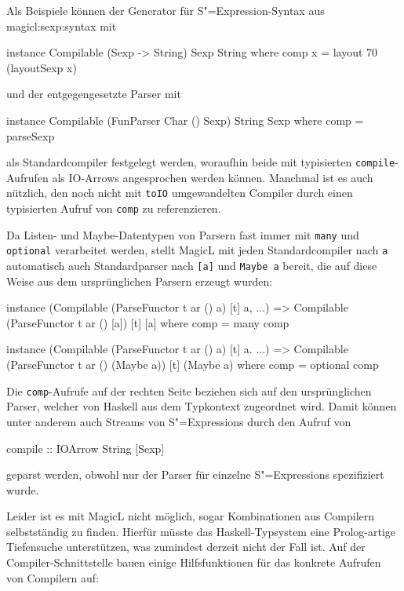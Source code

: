 \documentclass[12pt, a4paper, bibgerm]{scrbook}
\newenvironment{DIFnomarkup}{}{}
\newcommand\icode[1]{\lstinline?#1?}
\newcommand\sref{}
\newcommand{\sexp}{S"=Expression}
\newcommand{\sexps}{S"=Expressions}
\begin{document}
Als Beispiele können der Generator für \sexp{}-Syntax aus
\sref{magicl:sexp:syntax} mit
\begin{DIFnomarkup}\begin{code}
instance Compilable (Sexp -> String) Sexp String where
  comp x = layout 70 (layoutSexp x)
\end{code}\end{DIFnomarkup}
und der entgegengesetzte Parser mit
\begin{DIFnomarkup}\begin{code}
instance Compilable (FunParser Char () Sexp) String Sexp where
  comp = parseSexp
\end{code}\end{DIFnomarkup}
als Standardcompiler festgelegt werden, woraufhin beide mit typisierten
\icode{compile}-Aufrufen als IO-Arrows angesprochen werden
können. Manchmal ist es auch nützlich, den noch nicht mit \icode{toIO}
umgewandelten Compiler durch einen typisierten Aufruf von \icode{comp}
zu referenzieren.

Da Listen- und Maybe-Datentypen von Parsern fast immer mit \icode{many}
und \icode{optional} verarbeitet werden, stellt MagicL mit jeden
Standardcompiler nach \icode{a} automatisch auch Standardparser nach \icode{[a]} und
\icode{Maybe a} bereit, die auf diese Weise aus dem ursprünglichen
Parsern erzeugt wurden:
\begin{DIFnomarkup}\begin{code}
instance (Compilable (ParseFunctor t ar () a) [t] a, ...) =>
  Compilable (ParseFunctor t ar () [a]) [t] [a] where
    comp = many comp

instance (Compilable (ParseFunctor t ar () a) [t] a. ...) =>
  Compilable (ParseFunctor t ar () (Maybe a)) [t] (Maybe a) where
    comp = optional comp
\end{code}\end{DIFnomarkup}
Die \icode{comp}-Aufrufe auf der rechten Seite beziehen sich auf den
ursprünglichen Parser, welcher von Haskell aus dem Typkontext zugeordnet
wird. Damit können unter anderem auch Streams von \sexps{} durch den Aufruf von
\begin{code}
compile :: IOArrow String [Sexp]
\end{code}
geparst werden, obwohl nur der Parser für einzelne \sexps{}
spezifiziert wurde.

Leider ist es mit MagicL nicht möglich, sogar Kombinationen aus
Compilern selbstständig zu finden. Hierfür müsste das Haskell-Typsystem
eine Prolog-artige Tiefensuche unterstützen, was zumindest derzeit nicht
der Fall ist. Auf der Compiler-Schnittstelle bauen einige
Hilfsfunktionen für das konkrete Aufrufen von Compilern auf:
\end{document}
